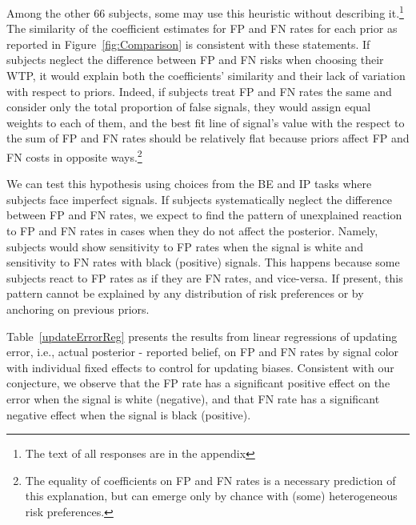 \documentclass[12pt,a4paper]{article}
\begin{document}
Among the other 66 subjects, some may use this heuristic without describing it.\footnote{The text of all responses are in the appendix} The similarity of the coefficient estimates for FP and FN rates for each prior as reported in Figure~\ref{fig:Comparison} is consistent with these statements. If subjects neglect the difference between FP and FN risks when choosing their WTP, it would explain both the coefficients' similarity and their lack of variation with respect to priors. Indeed, if subjects treat FP and FN rates the same and consider only the total proportion of false signals, they would assign equal weights to each of them, and the best fit line of signal's value with the respect to the sum of FP and FN rates should be relatively flat because priors affect FP and FN costs in opposite ways.\footnote{The equality of coefficients on FP and FN rates is a necessary prediction of this explanation, but can emerge only by chance with (some) heterogeneous risk preferences.}


We can test this hypothesis using choices from the BE and IP tasks where subjects face imperfect signals. If subjects systematically neglect the difference between FP and FN rates, we expect to find the pattern of unexplained reaction to FP and FN rates in cases when they do not affect the posterior. Namely, subjects would show sensitivity to FP rates when the signal is white and sensitivity to FN rates with black (positive) signals. This happens because some subjects react to FP rates as if they are FN rates, and vice-versa. If present, this pattern cannot be explained by any distribution of risk preferences or by anchoring on previous priors.  

Table~\ref{updateErrorReg} presents the results from linear regressions of updating error, i.e., actual posterior - reported belief, on FP and FN rates by signal color with individual fixed effects to control for updating biases. Consistent with our conjecture, we observe that the FP rate has a significant positive effect on the error when the signal is white (negative), and that FN rate has a significant negative effect when the signal is black (positive). 


\end{document}
